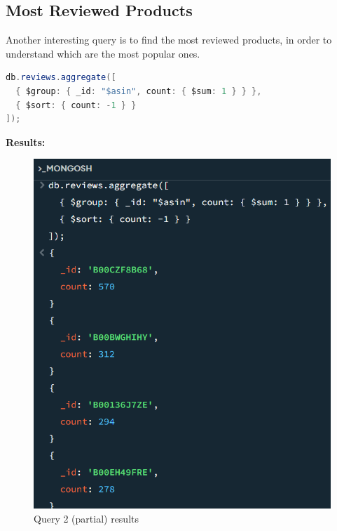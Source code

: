 \newpage
\subsection{Most Reviewed Products}
Another interesting query is to find the most reviewed products, in order to understand which are the most popular ones. \\
\begin{lstlisting}[language=Java]
db.reviews.aggregate([
  { $group: { _id: "$asin", count: { $sum: 1 } } },
  { $sort: { count: -1 } }
]);
\end{lstlisting}
\textbf{Results:}
\begin{figure}[H]
  \centering
  \includegraphics[scale=0.7]{Images/q2_result.png}
  \caption{Query 2 (partial) results}
  \label{fig:q2_result}
\end{figure}

\newpage
